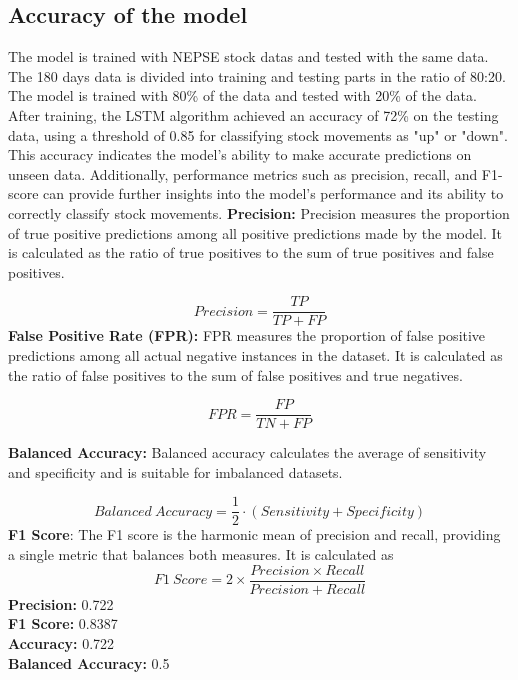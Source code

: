 \documentclass[./main.tex]{subfiles}
\begin{document}
\subsection*{Accuracy of the model}
The model is trained with NEPSE stock datas and tested with the same data. The 180 days data is divided into training and testing parts in the ratio of 80:20. The model is trained with 80\% of the data and tested with 20\% of the data.
After training, the LSTM algorithm achieved an accuracy of 72\% on the testing data, using a threshold of 0.85 for classifying stock movements as "up" or "down". This accuracy indicates the model's ability to make accurate predictions on unseen data. Additionally, performance metrics such as precision, recall, and F1-score can provide further insights into the model's performance and its ability to correctly classify stock movements.
\newline \noindent \textbf{Precision:} Precision measures the proportion of true positive predictions among all positive predictions made by the model. It is calculated as the ratio of true positives to the sum of true positives and false positives.

\[ Precision = \frac{TP}{TP + FP} \]
\noindent \textbf{False Positive Rate (FPR):} FPR measures the proportion of false positive predictions among all actual negative instances in the dataset. It is calculated as the ratio of false positives to the sum of false positives and true negatives.

\[ FPR = \frac{FP}{TN + FP} \]

\noindent \textbf{Balanced Accuracy:} Balanced accuracy calculates the average of sensitivity and specificity and is suitable for imbalanced datasets.

\[ Balanced \ Accuracy = \frac{1}{2} \cdot (Sensitivity + Specificity) \]
\newline \noindent \textbf{F1 Score}: The F1 score is the harmonic mean of precision and recall, providing a single metric that balances both measures. It is calculated as
\[ F1 \ Score = 2 \times \frac{Precision \times Recall}{Precision + Recall} \]
\noindent
\textbf{Precision:} 0.722 \\
\textbf{F1 Score:} 0.8387 \\
\textbf{Accuracy:} 0.722 \\
\textbf{Balanced Accuracy:} 0.5 \\
\end{document}
